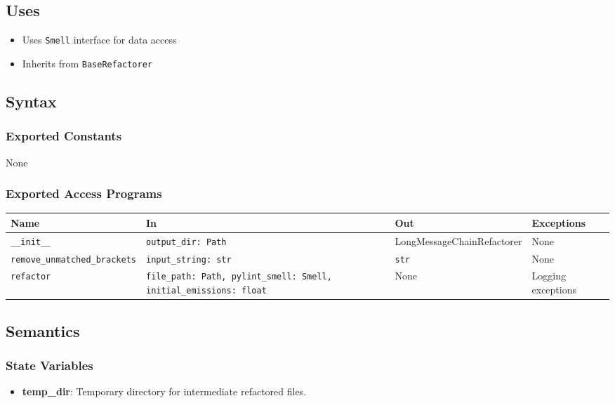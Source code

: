 \documentclass[12pt, titlepage]{article}
\begin{document}
\subsection{Uses}

\begin{itemize}
  \item Uses \texttt{Smell} interface for data access
  \item Inherits from \texttt{BaseRefactorer}
\end{itemize}

\subsection{Syntax}

\subsubsection{Exported Constants}
None

\subsubsection{Exported Access Programs}

\begin{center}
\begin{tabular}{|p{4cm}|p{5cm}|p{4cm}|p{3cm}|}
\hline
\textbf{Name} & \textbf{In} & \textbf{Out} & \textbf{Exceptions} \\
\hline
\texttt{\_\_init\_\_} & \texttt{output\_dir: Path} & LongMessageChainRefactorer & None \\
\hline
\texttt{remove\_unmatched\_brackets} & \texttt{input\_string: str} & \texttt{str} & None \\
\hline
\texttt{refactor} & \texttt{file\_path: Path, pylint\_smell: Smell, initial\_emissions: float} & None & Logging exceptions \\
\hline
\end{tabular}
\end{center}


\subsection{Semantics}

\subsubsection{State Variables}

\begin{itemize}
  \item \textbf{temp\_dir}: Temporary directory for intermediate refactored files.
\end{itemize}
\end{document}
